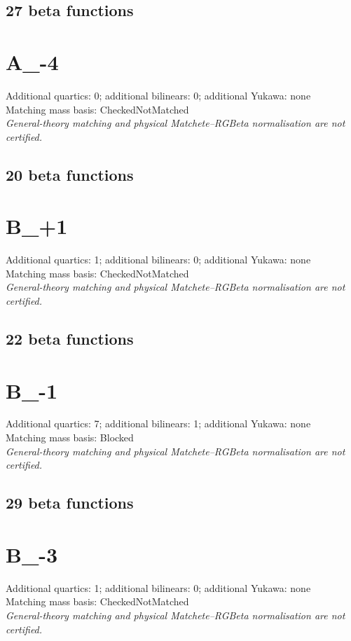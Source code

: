 \documentclass[10pt,a4paper]{article}
\begin{document}
\subsection*{27 beta functions}

\clearpage
\section{A\_-4}
Additional quartics: 0; additional bilinears: 0; additional Yukawa: none\\
Matching mass basis: CheckedNotMatched\\
\emph{General-theory matching and physical Matchete--RGBeta normalisation are not certified.}
\subsection*{20 beta functions}

\clearpage
\section{B\_+1}
Additional quartics: 1; additional bilinears: 0; additional Yukawa: none\\
Matching mass basis: CheckedNotMatched\\
\emph{General-theory matching and physical Matchete--RGBeta normalisation are not certified.}
\subsection*{22 beta functions}

\clearpage
\section{B\_-1}
Additional quartics: 7; additional bilinears: 1; additional Yukawa: none\\
Matching mass basis: Blocked\\
\emph{General-theory matching and physical Matchete--RGBeta normalisation are not certified.}
\subsection*{29 beta functions}

\clearpage
\section{B\_-3}
Additional quartics: 1; additional bilinears: 0; additional Yukawa: none\\
Matching mass basis: CheckedNotMatched\\
\emph{General-theory matching and physical Matchete--RGBeta normalisation are not certified.}
\end{document}
